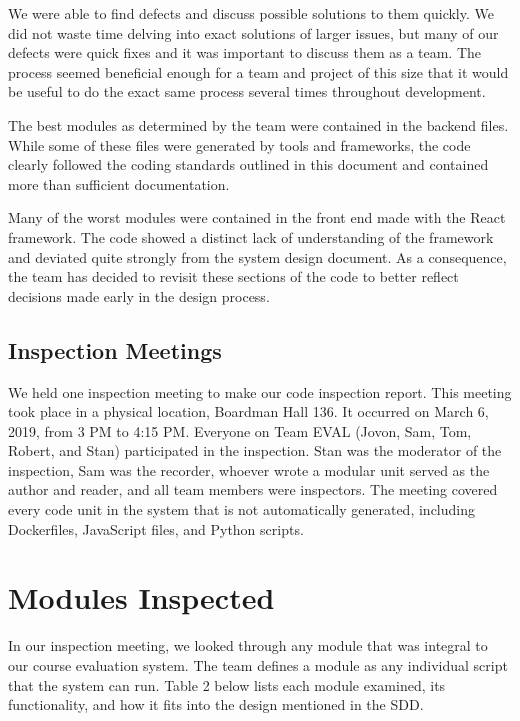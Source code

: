 \documentclass{article}
\begin{document}
We were able to find defects and discuss possible solutions to them quickly. We did not waste time delving into exact solutions of larger issues, but many of our defects were quick fixes and it was important to discuss them as a team. The process seemed beneficial enough for a team and project of this size that it would be useful to do the exact same process several times throughout development.

The best modules as determined by the team were contained in the backend files. While some of these files were generated by tools and frameworks, the code clearly followed the coding standards outlined in this document and contained more than sufficient documentation. 

Many of the worst modules were contained in the front end made with the React framework. The code showed a distinct lack of understanding of the framework and deviated quite strongly from the system design document. As a consequence, the team has decided to revisit these sections of the code to better reflect decisions made early in the design process. 

\subsection{Inspection Meetings}

We held one inspection meeting to make our code inspection report. This meeting took place in a physical location, Boardman Hall 136. It occurred on March 6, 2019, from 3 PM to 4:15 PM. Everyone on Team EVAL (Jovon, Sam, Tom, Robert, and Stan) participated in the inspection. Stan was the moderator of the inspection, Sam was the recorder, whoever wrote a modular unit served as the author and reader, and all team members were inspectors. The meeting covered every code unit in the system that is not automatically generated, including Dockerfiles, JavaScript files, and Python scripts.

\section{Modules Inspected}

In our inspection meeting, we looked through any module that was integral to our course evaluation system. The team defines a module as any individual script that the system can run. Table 2 below lists each module examined, its functionality, and how it fits into the design mentioned in the SDD.
\end{document}
